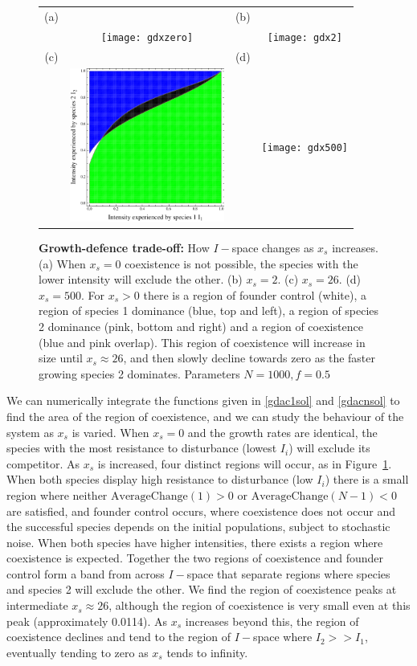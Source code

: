 \documentclass[preprint,10pt,reqno]{amsart}
\begin{document}
\begin{figure}[htbp]
\begin{tabular}{cccc}
(a)&&(b)&\\
&\texttt{[image: gdxzero]}&&\texttt{[image: gdx2]} \\
(c)&&(d)&\\
&\includegraphics[width=2in]{gdx26}&&\texttt{[image: gdx500]}
\end{tabular}
\caption{\textbf{Growth-defence trade-off:} How $I-$space changes as $x_s$ increases. (a) When $x_s=0$ coexistence is not possible, the species with the lower intensity will exclude the other. (b) $x_s=2$. (c) $x_s=26$. (d) $x_s=500$. For $x_s>0$ there is a region of founder control (white), a region of species 1 dominance (blue, top and left), a region of species 2 dominance (pink, bottom and right) and a region of coexistence (blue and pink overlap). This region of coexistence will increase in size until $x_s\approx 26$, and then slowly decline towards zero as the faster growing species 2 dominates. Parameters $N=1000,f=0.5$}
\label{gd}
\end{figure}

We can numerically integrate the functions given in \eqref{gdac1sol} and \eqref{gdacnsol} to find the area of the region of coexistence, and  we can study the behaviour of the system as $x_s$ is varied. When $x_s=0$ and the growth rates are identical, the species with the most resistance to disturbance (lowest $I_i$) will exclude its competitor.  As $x_s$ is increased, four distinct regions will occur, as in Figure~\ref{gd}. When both species display high resistance to disturbance (low $I_i$) there is a small region where neither $\text{AverageChange}(1)>0$ or $\text{AverageChange}(N-1)<0$ are satisfied, and founder control occurs, where coexistence does not occur and the successful species depends on the initial populations, subject to stochastic noise. When both species have higher intensities, there exists a region where coexistence is expected. Together the two regions of coexistence and founder control form a band from across $I-$space that separate regions where species and species 2 will exclude the other. We find the region of coexistence peaks at intermediate $x_s \approx 26$, although the region of coexistence is very small even at this peak (approximately 0.0114). As $x_s$ increases beyond this, the region of coexistence declines and tend to the region of $I-$space where $I_2>>I_1$, eventually tending to zero as $x_s$ tends to infinity.
\end{document}
